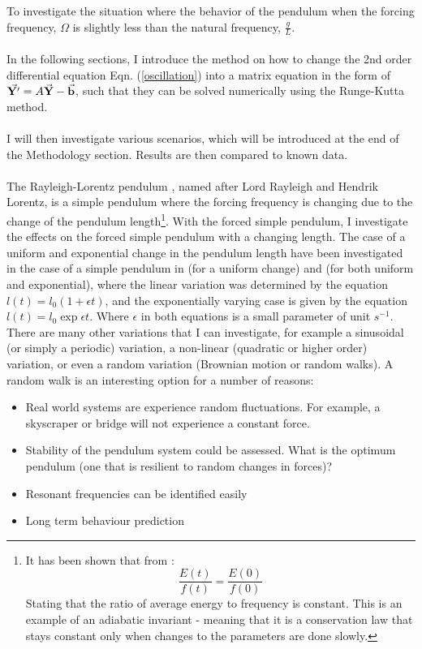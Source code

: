 \documentclass[10pt, twocolumn]{article}
\begin{document}
To investigate the situation where the behavior of the pendulum when the forcing frequency, $\Omega$ is slightly less than the natural frequency, $\frac{g}{L}$.
\\
\\
In the following sections, I introduce the method on how to change the 2nd order differential equation Eqn. (\ref{oscillation}) into a matrix equation in the form of $\vec{\bold{Y'}} = A\vec{\bold{Y}} - \vec{\bold{b}}$, such that they can be solved numerically using the Runge-Kutta method.
\\
\\
I will then investigate various scenarios, which will be introduced at the end of the Methodology section. Results are then compared to known data.
\\
\\
The Rayleigh-Lorentz pendulum \cite{Rayleigh1902}, named after Lord Rayleigh and Hendrik Lorentz, is a simple pendulum where the forcing frequency is changing due to the change of the pendulum length\footnote{It has been shown that from \cite{Rayleigh1902}:
\begin{equation}
    \frac{E(t)}{f(t)} = \frac{E(0)}{f(0)}
\end{equation}
Stating that the ratio of average energy to frequency is constant. This is an example of an adiabatic invariant - meaning that it is a conservation law that stays constant only when changes to the parameters are done slowly. }. With the forced simple pendulum, I investigate the effects on the forced simple pendulum with a changing length. The case of a uniform and exponential change in the pendulum length have been investigated in the case of a simple pendulum in \cite{Brearley1966, Werner1969, Ross1979} (for a uniform change) and \cite{SanchezZoido2013} (for both uniform and exponential), where the linear variation was determined by the equation $l(t) = l_0 (1 + \epsilon{t})$, and the exponentially varying case is given by the equation $l(t) = l_0\exp{\epsilon t}$. Where $\epsilon$ in both equations is a small parameter of unit $s^{-1}$. There are many other variations that I can investigate, for example a sinusoidal (or simply a periodic) variation, a non-linear (quadratic or higher order) variation, or even a random variation (Brownian motion or random walks). A random walk is an interesting option for a number of reasons:
\begin{itemize}
    \item Real world systems are experience random fluctuations. For example, a skyscraper or bridge will not experience a constant force.
    \item Stability of the pendulum system could be assessed. What is the optimum pendulum (one that is resilient to random changes in forces)?
    \item Resonant frequencies can be identified easily
    \item Long term behaviour prediction
\end{itemize}
\end{document}

